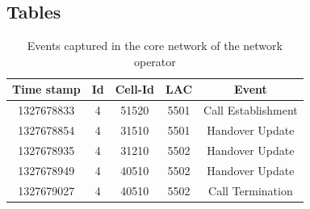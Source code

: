 \documentclass[twocolumn]{bmcart}%
\begin{document}
\begin{backmatter}
	\section*{Tables}
	
	\begin{table}[h]
		\caption{Events captured in the core network of the network operator}
		\begin{tabular}{|c|c|c|c|c|}
			\hline
			Time stamp & Id & Cell-Id & LAC  & Event              \\ \hline
			1327678833 & 4  & 51520   & 5501 & Call Establishment \\
			1327678854 & 4  & 31510   & 5501 & Handover Update    \\
			1327678935 & 4  & 31210   & 5502 & Handover Update    \\
			1327678949 & 4  & 40510   & 5502 & Handover Update    \\
			1327679027 & 4  & 40510   & 5502 & Call Termination   \\ \hline
		\end{tabular}
		\label{table:events}
	\end{table}
	

\end{backmatter}
\end{document}
